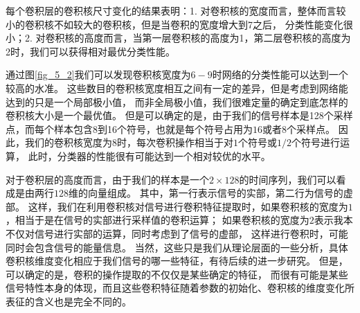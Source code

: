 每个卷积层的卷积核尺寸变化的结果表明：1. 对卷积核的宽度而言，整体而言较小的卷积核不如较大的卷积核，但是当卷积的宽度增大到7之后，
分类性能变化很小；2. 对卷积核的高度而言，当第一层卷积核的高度为1，第二层卷积核的高度为2时，我们可以获得相对最优分类性能。\par

通过图\ref{fig_5_2}我们可以发现卷积核宽度为$6-9$时网络的分类性能可以达到一个较高的水准。
这些数目的卷积核宽度相互之间有一定的差异，但是考虑到网络能达到的只是一个局部极小值，
而非全局极小值，我们很难定量的确定到底怎样的卷积核大小是一个最优值。
但是可以确定的是，由于我们的信号样本是128个采样点，而每个样本包含8到16个符号，也就是每个符号占用为$16$或者$8$个采样点。
因此，我们的卷积核宽度为$8$时，每次卷积操作相当于对$1$个符号或$1/2$个符号进行运算，
此时，分类器的性能很有可能达到一个相对较优的水平。\par

对于卷积层的高度而言，由于我们的样本是一个$2\times128$的时间序列，我们可以看成是由两行$128$维的向量组成。
其中，第一行表示信号的实部，第二行为信号的虚部。
这样，我们在利用卷积核对信号进行卷积特征提取时，如果卷积核的宽度为$1$，相当于是在信号的实部进行采样值的卷积运算；
如果卷积核的宽度为$2$表示我本不仅对信号进行实部的运算，同时考虑到了信号的虚部，
这样进行卷积时，可能同时会包含信号的能量信息。
当然，这些只是我们从理论层面的一些分析，具体卷积核维度变化相应于我们信号的哪一些特征，有待后续的进一步研究。
但是，可以确定的是，卷积的操作提取的不仅仅是某些确定的特征，
而很有可能是某些信号特性本身的体现，而且这些卷积特征随着参数的初始化、卷积核的维度变化所表征的含义也是完全不同的。\par

